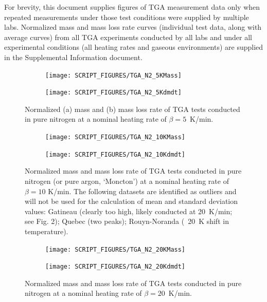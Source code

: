 \documentclass{book}
\begin{document}
For brevity, this document supplies figures of TGA measurement data only when repeated measurements under those test conditions were supplied by multiple labs. Normalized mass and mass loss rate curves (individual test data, along with average curves) from all TGA experiments conducted by all labs and under all experimental conditions (all heating rates and gaseous environments) are supplied in the Supplemental Information document.

\begin{figure}
\centering
\begin{subfigure}[b]{0.85\textwidth}
   \texttt{[image: SCRIPT\_FIGURES/TGA\_N2\_5KMass]}
   \caption{}
   \label{Fig:TGA_N2_5KMass}
\end{subfigure}

\begin{subfigure}[b]{0.85\textwidth}
   \texttt{[image: SCRIPT\_FIGURES/TGA\_N2\_5Kdmdt]}
   \caption{}
   \label{Fig:TGA_N2_5Kdmdt}
\end{subfigure}

  \caption{Normalized (a) mass and (b) mass loss rate of TGA tests conducted in pure nitrogen at a nominal heating rate of $\beta=5$~K/min.}
  \label{Fig:TGA_N2_5K}
\end{figure}

\begin{figure}
\centering
\begin{subfigure}[b]{0.85\textwidth}
   \texttt{[image: SCRIPT\_FIGURES/TGA\_N2\_10KMass]}
   \caption{}
   \label{Fig:TGA_N2_10KMass}
\end{subfigure}

\begin{subfigure}[b]{0.85\textwidth}
   \texttt{[image: SCRIPT\_FIGURES/TGA\_N2\_10Kdmdt]}
   \caption{}
   \label{Fig:TGA_N2_10Kdmdt}
\end{subfigure}

  \caption{Normalized mass and mass loss rate of TGA tests conducted in pure nitrogen (or pure argon, ‘Moncton’) at a nominal heating rate of $\beta = 10$ K/min. The following datasets are identified as outliers and will not be used for the calculation of mean and standard deviation values: Gatineau (clearly too high, likely conducted at 20~K/min; see Fig. 2); Quebec (two peaks); Rouyn-Noranda (~20~K shift in temperature).}
  \label{Fig:TGA_N2_10K}
\end{figure}

\begin{figure}
\centering
\begin{subfigure}[b]{0.85\textwidth}
   \texttt{[image: SCRIPT\_FIGURES/TGA\_N2\_20KMass]}
   \caption{}
   \label{Fig:TGA_N2_20KMass}
\end{subfigure}

\begin{subfigure}[b]{0.85\textwidth}
   \texttt{[image: SCRIPT\_FIGURES/TGA\_N2\_20Kdmdt]}
   \caption{}
   \label{Fig:TGA_N2_20Kdmdt}
\end{subfigure}

  \caption{Normalized mass and mass loss rate of TGA tests conducted in pure nitrogen at a nominal heating rate of $\beta=20$~K/min.}
  \label{Fig:TGA_N2_20K}
\end{figure}
\end{document}
